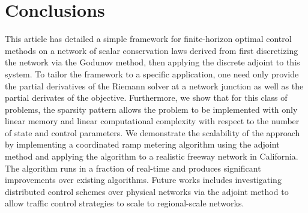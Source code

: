 \section{Conclusions\label{sec:Conclusions}}

This article has detailed a simple framework for finite-horizon optimal control methods on a network of scalar conservation laws derived from first discretizing the network via the Godunov method, then applying the discrete adjoint to this system. To tailor the framework to a specific application, one need only provide the partial derivatives of the Riemann solver at a network junction as well as the partial derivates of the objective. Furthermore, we show that for this class of problems, the sparsity pattern allows the problem to be implemented with only linear memory and linear computational complexity with respect to the number of state and control parameters. We demonstrate the scalability of the approach by implementing a coordinated ramp metering algorithm using the adjoint method and applying the algorithm to a realistic freeway network in California. The algorithm runs in a fraction of real-time and produces significant improvements over existing algorithms. Future works includes investigating distributed control schemes over physical networks via the adjoint method to allow traffic control strategies to scale to regional-scale networks.